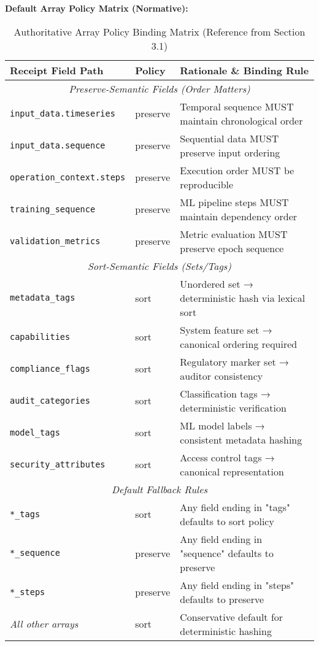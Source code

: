 \documentclass[12pt,a4paper]{article}
\begin{document}
\begin{technicalbox}
\begin{itemize}
\textbf{Default Array Policy Matrix (Normative):}
\begin{table}[H]
\centering
\begin{tabular}{p{4.5cm}p{1.8cm}p{5.7cm}}
\toprule
\textbf{Receipt Field Path} & \textbf{Policy} & \textbf{Rationale \& Binding Rule} \\
\midrule
\multicolumn{3}{c}{\textit{Preserve-Semantic Fields (Order Matters)}} \\
\midrule
\texttt{input\_data.timeseries} & preserve & Temporal sequence MUST maintain chronological order \\
\texttt{input\_data.sequence} & preserve & Sequential data MUST preserve input ordering \\
\texttt{operation\_context.steps} & preserve & Execution order MUST be reproducible \\
\texttt{training\_sequence} & preserve & ML pipeline steps MUST maintain dependency order \\
\texttt{validation\_metrics} & preserve & Metric evaluation MUST preserve epoch sequence \\
\midrule
\multicolumn{3}{c}{\textit{Sort-Semantic Fields (Sets/Tags)}} \\
\midrule
\texttt{metadata\_tags} & sort & Unordered set → deterministic hash via lexical sort \\
\texttt{capabilities} & sort & System feature set → canonical ordering required \\
\texttt{compliance\_flags} & sort & Regulatory marker set → auditor consistency \\
\texttt{audit\_categories} & sort & Classification tags → deterministic verification \\
\texttt{model\_tags} & sort & ML model labels → consistent metadata hashing \\
\texttt{security\_attributes} & sort & Access control tags → canonical representation \\
\midrule
\multicolumn{3}{c}{\textit{Default Fallback Rules}} \\
\midrule
\texttt{*\_tags} & sort & Any field ending in "tags" defaults to sort policy \\
\texttt{*\_sequence} & preserve & Any field ending in "sequence" defaults to preserve \\
\texttt{*\_steps} & preserve & Any field ending in "steps" defaults to preserve \\
\textit{All other arrays} & sort & Conservative default for deterministic hashing \\
\bottomrule
\end{tabular}
\caption{Authoritative Array Policy Binding Matrix (Reference from Section 3.1)}
\label{tab:array_policy_binding}
\end{table}


\end{itemize}
\end{technicalbox}
\end{document}
